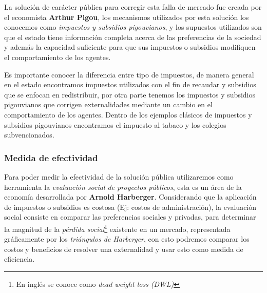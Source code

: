 La solución de carácter pública para corregir esta falla de mercado fue creada por el economista \textbf{Arthur Pigou}, los mecanismos utilizados por esta solución los conocemos como \textit{impuestos y subsidios pigouvianos}, y los supuestos utilizados son que el estado tiene información completa acerca de las preferencias de la sociedad y además la capacidad suficiente para que sus impuestos o subsidios modifiquen el comportamiento de los agentes.

Es importante conocer la diferencia entre tipo de impuestos, de manera general en el estado encontramos impuestos utilizados con el fin de recaudar y subsidios que se enfocan en redistribuir, por otra parte tenemos los impuestos y subsidios pigouvianos que corrigen externalidades mediante un cambio en el comportamiento de los agentes. Dentro de los ejemplos clásicos de impuestos y subsidios pigouvianos encontramos el impuesto al tabaco y los colegios subvencionados.

\subsubsection{Medida de efectividad}

Para poder medir la efectividad de la solución pública utilizaremos como herramienta la \textit{evaluación social de proyectos públicos}, esta es un área de la economía desarrollada por \textbf{Arnold Harberger}. Considerando que la aplicación de impuestos o subsidios es costosa (Ej: costos de administración), la evaluación social consiste en comparar las preferencias sociales y privadas, para determinar la magnitud de la \textit{pérdida social}\footnote{En inglés se conoce como \textit{dead weight loss (DWL)}} existente en un mercado, representada gráficamente por los \textit{triángulos de Harberger}, con esto podremos comparar los costos y beneficios de resolver una externalidad y usar esto como medida de eficiencia. 